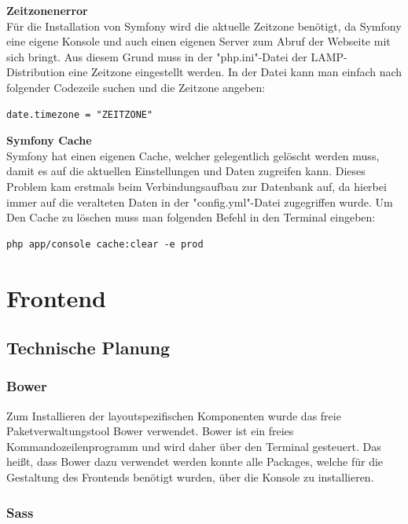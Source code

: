 \textbf{Zeitzonenerror}\\
Für die Installation von Symfony wird die aktuelle Zeitzone benötigt, da Symfony eine eigene Konsole und auch einen eigenen Server zum Abruf der Webseite mit sich bringt.
Aus diesem Grund muss in der "php.ini"-Datei der LAMP-Distribution eine Zeitzone eingestellt werden. In der Datei kann man einfach nach folgender Codezeile suchen und die Zeitzone angeben:
	\lstset{language=java}
  	\begin{lstlisting}
date.timezone = "ZEITZONE"
  	\end{lstlisting}
\textbf{Symfony Cache}\\
Symfony hat einen eigenen Cache, welcher gelegentlich gelöscht werden muss, damit es auf die aktuellen Einstellungen und Daten zugreifen kann.
Dieses Problem kam erstmals beim Verbindungsaufbau zur Datenbank auf, da hierbei immer auf die veralteten Daten in der "config.yml"-Datei zugegriffen wurde.
Um Den Cache zu löschen muss man folgenden Befehl in den Terminal eingeben:
	\lstset{language=bash}
  	\begin{lstlisting}
php app/console cache:clear -e prod
  	\end{lstlisting}

\section{Frontend}

  \subsection{Technische Planung}

    \subsubsection{Bower}

Zum Installieren der layoutspezifischen Komponenten wurde das freie Paketverwaltungstool Bower verwendet. Bower ist ein freies Kommandozeilenprogramm und wird daher über den Terminal gesteuert. Das heißt, dass Bower dazu verwendet werden konnte alle Packages, welche für die Gestaltung des Frontends benötigt wurden, über die Konsole zu installieren.

    \subsubsection{Sass}

